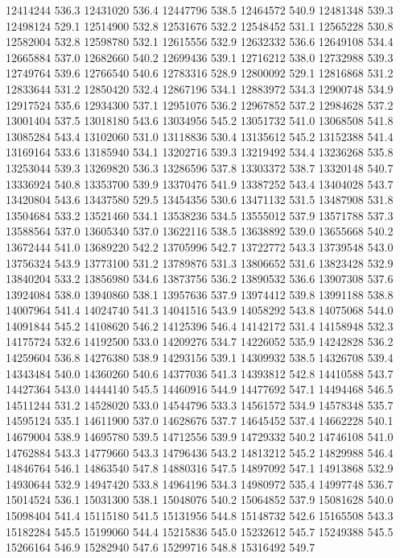 12414244 536.3
12431020 536.4
12447796 538.5
12464572 540.9
12481348 539.3
12498124 529.1
12514900 532.8
12531676 532.2
12548452 531.1
12565228 530.8
12582004 532.8
12598780 532.1
12615556 532.9
12632332 536.6
12649108 534.4
12665884 537.0
12682660 540.2
12699436 539.1
12716212 538.0
12732988 539.3
12749764 539.6
12766540 540.6
12783316 528.9
12800092 529.1
12816868 531.2
12833644 531.2
12850420 532.4
12867196 534.1
12883972 534.3
12900748 534.9
12917524 535.6
12934300 537.1
12951076 536.2
12967852 537.2
12984628 537.2
13001404 537.5
13018180 543.6
13034956 545.2
13051732 541.0
13068508 541.8
13085284 543.4
13102060 531.0
13118836 530.4
13135612 545.2
13152388 541.4
13169164 533.6
13185940 534.1
13202716 539.3
13219492 534.4
13236268 535.8
13253044 539.3
13269820 536.3
13286596 537.8
13303372 538.7
13320148 540.7
13336924 540.8
13353700 539.9
13370476 541.9
13387252 543.4
13404028 543.7
13420804 543.6
13437580 529.5
13454356 530.6
13471132 531.5
13487908 531.8
13504684 533.2
13521460 534.1
13538236 534.5
13555012 537.9
13571788 537.3
13588564 537.0
13605340 537.0
13622116 538.5
13638892 539.0
13655668 540.2
13672444 541.0
13689220 542.2
13705996 542.7
13722772 543.3
13739548 543.0
13756324 543.9
13773100 531.2
13789876 531.3
13806652 531.6
13823428 532.9
13840204 533.2
13856980 534.6
13873756 536.2
13890532 536.6
13907308 537.6
13924084 538.0
13940860 538.1
13957636 537.9
13974412 539.8
13991188 538.8
14007964 541.4
14024740 541.3
14041516 543.9
14058292 543.8
14075068 544.0
14091844 545.2
14108620 546.2
14125396 546.4
14142172 531.4
14158948 532.3
14175724 532.6
14192500 533.0
14209276 534.7
14226052 535.9
14242828 536.2
14259604 536.8
14276380 538.9
14293156 539.1
14309932 538.5
14326708 539.4
14343484 540.0
14360260 540.6
14377036 541.3
14393812 542.8
14410588 543.7
14427364 543.0
14444140 545.5
14460916 544.9
14477692 547.1
14494468 546.5
14511244 531.2
14528020 533.0
14544796 533.3
14561572 534.9
14578348 535.7
14595124 535.1
14611900 537.0
14628676 537.7
14645452 537.4
14662228 540.1
14679004 538.9
14695780 539.5
14712556 539.9
14729332 540.2
14746108 541.0
14762884 543.3
14779660 543.3
14796436 543.2
14813212 545.2
14829988 546.4
14846764 546.1
14863540 547.8
14880316 547.5
14897092 547.1
14913868 532.9
14930644 532.9
14947420 533.8
14964196 534.3
14980972 535.4
14997748 536.7
15014524 536.1
15031300 538.1
15048076 540.2
15064852 537.9
15081628 540.0
15098404 541.4
15115180 541.5
15131956 544.8
15148732 542.6
15165508 543.3
15182284 545.5
15199060 544.4
15215836 545.0
15232612 545.7
15249388 545.5
15266164 546.9
15282940 547.6
15299716 548.8
15316492 549.7

